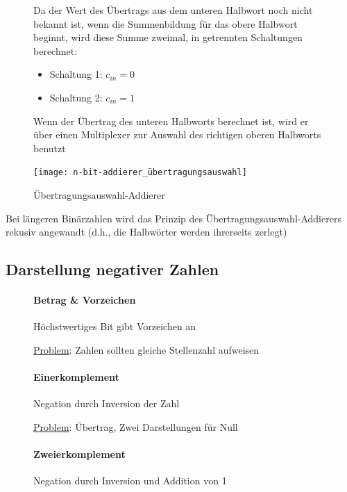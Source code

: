 \documentclass[12pt]{report}
\begin{document}
\begin{figure}[H]
  \begin{minipage}[t]{.45\textwidth}
    Da der Wert des Übertrags aus dem unteren Halbwort noch nicht bekannt ist, wenn die Summenbildung für das obere
    Halbwort beginnt, wird diese Summe zweimal, in getrennten Schaltungen berechnet:
    \begin{itemize}
      \item Schaltung 1: $c_{in} = 0$
      \item Schaltung 2: $c_{in} = 1$
    \end{itemize}
    \par Wenn der Übertrag des unteren Halbworts berechnet ist, wird er über einen 
    Multiplexer zur Auswahl des richtigen oberen Halbworts benutzt
  \end{minipage}
  \hfill
  \begin{minipage}[t]{.45\textwidth}
    \caption{Übertragungsauswahl-Addierer}
    \centering
    \texttt{[image: n-bit-addierer\_übertragungsauswahl]}
  \end{minipage}
\end{figure}

\begin{infobox}
  Bei längeren Binärzahlen wird das Prinzip des Übertragungsauswahl-Addierers rekusiv angewandt (d.h., die Halbwörter werden ihrerseits zerlegt)
\end{infobox}

\subsection{Darstellung negativer Zahlen}
\begin{figure}[H]
  \begin{minipage}[t]{.3\textwidth}
    \centering
    \paragraph{Betrag \& Vorzeichen}
    \small Höchstwertiges Bit gibt Vorzeichen an
    
    \underline{Problem}: Zahlen sollten gleiche Stellenzahl aufweisen
  \end{minipage}
  \hfill
  \begin{minipage}[t]{.3\textwidth}
    \centering
    \paragraph{Einerkomplement}
    \small Negation durch Inversion der Zahl
    
    \underline{Problem}: Übertrag, Zwei Darstellungen für Null
  \end{minipage}
  \hfill
  \begin{minipage}[t]{.3\textwidth}
    \centering
    \paragraph{Zweierkomplement}
    \small Negation durch Inversion und Addition von 1
  \end{minipage}
\end{figure}
\end{document}
